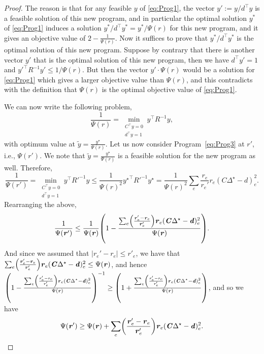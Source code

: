 \documentclass[11pt]{article}
\let\originalleft\left
\let\originalright\right
\renewcommand{\left}{\mathopen{}\mathclose\bgroup\originalleft}
\renewcommand{\right}{\aftergroup\egroup\originalright}
\newcommand\dd{\boldsymbol{\mathit{d}}}
\newcommand\rr{\boldsymbol{\mathit{r}}}
\newcommand\yy{\boldsymbol{\mathit{y}}}
\newcommand\yytil{\widetilde{\boldsymbol{\mathit{y}}}}
\newcommand\CC{\boldsymbol{\mathit{C}}}
\newcommand\RR{\boldsymbol{\mathit{R}}}
\begin{document}
\begin{proof}
    The reason is that for any feasible $\yy$ of \eqref{eq:Prog1}, the vector $\yy' := \yy/\dd^{\top} \yy$ is a feasible solution of this new program, and in particular the optimal solution $\yy^*$ of \eqref{eq:Prog1} induces a solution $\yy^* / \dd^{\top} \yy^* = \yy^* / \Psi(\rr)$ for this new program, and it gives an objective value of $2 - \frac{1}{\Psi(\rr)}$. Now it suffices to prove that $\yy^* / \dd^{\top} \yy^*$ is the optimal solution of this new program. Suppose by contrary that there is another vector $\yy'$ that is the optimal solution of this new program, then we have $\dd^{\top} \yy' =1$ and $\yy'^{\top} \RR^{-1} \yy' \leq 1/\Psi(\rr)$. But then the vector $\yy' \cdot \Psi(\rr)$ would be a solution for \eqref{eq:Prog1} which gives a larger objective value than $\Psi(\rr)$, and this contradicts with the definition that $\Psi(\rr)$ is the optimal objective value of \eqref{eq:Prog1}.
    
    We can now write the following problem,
    \begin{equation}\label{eq:Prog3}
    \frac{1}{\Psi(\rr)} = \min_{\substack{\CC^{\top}\yy = 0\\ \dd^{\top}\yy = 1}} \yy^{\top}\RR^{-1}\yy,
    \end{equation}
    with optimum value at $\yytil = \frac{\yy^{\star}}{\Psi(\rr)}$. Let us now consider Program~\ref{eq:Prog3} at $\rr'$, i.e., $\Psi(\rr')$. We note that $\yytil=\frac{\yy^{\star}}{\Psi(\rr)}$ is a feasible solution for the new program as well. Therefore,
    \[
    \frac{1}{\Psi(\rr')} = \min_{\substack{\CC^{\top}\yy = 0\\ \dd^{\top}\yy = 1}} \yy^{\top}{\RR'}^{-1}\yy \leq \frac{1}{\Psi(\rr)^2} {\yy^{\star}}^{\top}{\RR'}^{-1}\yy^{\star} =\frac{1}{\Psi(\rr)^2} \sum_e \frac{\rr_e}{\rr_e'} \rr_e (\CC\Delta^{\star}-\dd)_e^2.
    \]
    Rearranging the above,
    \[
    \frac{1}{\Psi(\rr')} \leq \frac{1}{\Psi(\rr)}\left(1 - \frac{ \sum_e \left(\frac{\rr_e' - \rr_e}{\rr_e'}\right) \rr_e (\CC\Delta^{\star}-\dd)_e^2}{\Psi(\rr)}\right).
    \]
    And since we assumed that $|\rr_e'-\rr_e| \leq \rr'_e$, we have that $\sum_e \left(\frac{\rr_e' - \rr_e}{\rr_e'}\right) \rr_e (\CC\Delta^{\star}-\dd)_e^2 \leq \Psi(\rr)$, and hence $\left(1 - \frac{ \sum_e \left(\frac{\rr_e' - \rr_e}{\rr_e'}\right) \rr_e (\CC\Delta^{\star}-\dd)_e^2}{\Psi(\rr)}\right)^{-1} \geq \left(1 + \frac{ \sum_e \left(\frac{\rr_e' - \rr_e}{\rr_e'}\right) \rr_e (\CC\Delta^{\star}-\dd)_e^2}{\Psi(\rr)}\right)$, and so we have
    \[
    \Psi(\rr') \geq \Psi(\rr)+  \sum_e \left(\frac{\rr_e' - \rr_e}{\rr_e'}\right) \rr_e (\CC\Delta^{\star}-\dd)_e^2.
    \]
\end{proof}
\end{document}
